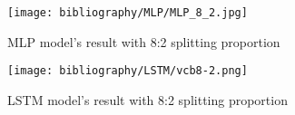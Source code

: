 \documentclass{ieeeojies}
\begin{document}
\begin{figure}[H]
  \centering
  \begin{minipage}{0.8\linewidth}
    \centering
    \texttt{[image: bibliography/MLP/MLP\_8\_2.jpg]}
    \caption{MLP model's result with 8:2 splitting proportion}
    \label{fig8}
  \end{minipage}
\end{figure}
\begin{figure}[H]
  \centering
  \begin{minipage}{0.8\linewidth}
    \centering
    \texttt{[image: bibliography/LSTM/vcb8-2.png]}
    \caption{LSTM model's result with 8:2 splitting proportion}
    \label{fig8}
  \end{minipage}
\end{figure}
\end{document}
